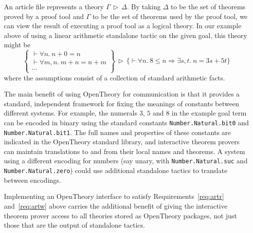 \documentclass{llncs}
\newcommand{\OpenTheory}{OpenTheory\xspace}
\newcommand{\theory}[2]{{#1}\,\triangleright\,{#2}}
\begin{document}
An article file represents a theory $\theory{\Gamma}{\Delta}$.
By taking $\Delta$ to be the set of theorems proved by a proof tool and $\Gamma$ to be the set of theorems used by the proof tool, we can view the result of executing a proof tool as a logical theory.
In our example above of using a linear arithmetic standalone tactic on the given goal, this theory might be
\[
\theory{\left\{\begin{array}{l}
\vdash\forall n.\ n + 0 = n \\
\vdash\forall m,n.\ m + n = n + m \\
\cdots
\end{array}\right\}}
{\bigl\{\vdash\forall n.\ 8\le n\Rightarrow\exists s,t.\ n = 3s + 5t\bigr\}}
\]
where the assumptions consist of a collection of standard arithmetic facts.


The main benefit of using \OpenTheory for communication is that it provides a standard, independent framework for fixing the meanings of constants between different systems.
For example, the numerals $3$, $5$ and $8$ in the example goal term can be encoded in binary using the standard constants \texttt{Number.Natural.bit0} and \texttt{Number.Natural.bit1}.
The full names and properties of these constants are indicated in the \OpenTheory standard library, and interactive theorem provers can maintain translations to and from their local names and theorems.
A system using a different encoding for numbers (say unary, with \texttt{Number.Natural.suc} and \texttt{Number.Natural.zero}) could use additional standalone tactics to translate between encodings.

Implementing an \OpenTheory interface to satisfy Requirements~\ref{req:artr} and~\ref{req:artw} above carries the additional benefit of giving the interactive theorem prover access to all theories stored as \OpenTheory packages, not just those that are the output of standalone tactics.
\end{document}
